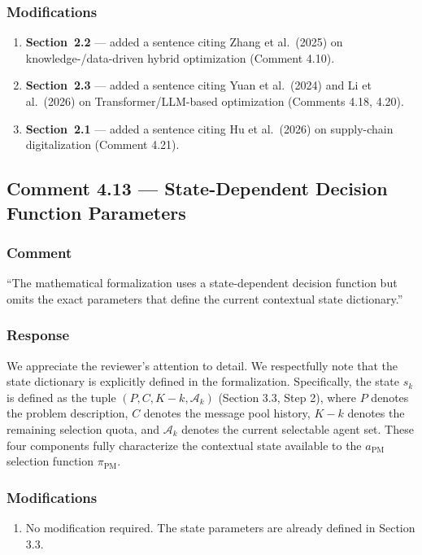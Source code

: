 \documentclass[11pt,a4paper]{article}
\begin{document}
\subsubsection{Modifications}
\begin{enumerate}
\item \textbf{Section~2.2} --- added a sentence citing Zhang et al.\ (2025) on knowledge-/data-driven hybrid optimization (Comment 4.10).
\item \textbf{Section~2.3} --- added a sentence citing Yuan et al.\ (2024) and Li et al.\ (2026) on Transformer/LLM-based optimization (Comments 4.18, 4.20).
\item \textbf{Section~2.1} --- added a sentence citing Hu et al.\ (2026) on supply-chain digitalization (Comment 4.21).
\end{enumerate}
\subsection{Comment 4.13 --- State-Dependent Decision Function Parameters}

\subsubsection{Comment}
``The mathematical formalization uses a state-dependent decision function but omits the exact parameters that define the current contextual state dictionary.''

\subsubsection{Response}
We appreciate the reviewer's attention to detail. We respectfully note that the state dictionary is explicitly defined in the formalization. Specifically, the state $s_k$ is defined as the tuple $(P, C, K-k, \mathcal{A}_k)$ (Section 3.3, Step 2), where $P$ denotes the problem description, $C$ denotes the message pool history, $K-k$ denotes the remaining selection quota, and $\mathcal{A}_k$ denotes the current selectable agent set. These four components fully characterize the contextual state available to the $a_{\text{PM}}$ selection function $\pi_{\mathrm{PM}}$.

\subsubsection{Modifications}
\begin{enumerate}
\item No modification required. The state parameters are already defined in Section 3.3.
\end{enumerate}
\end{document}

